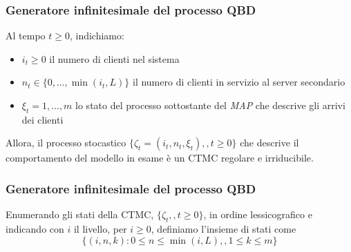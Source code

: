 \documentclass{beamer}
\begin{document}
\begin{frame}
    \frametitle{Generatore infinitesimale del processo QBD}
    Al tempo $t\geq 0$, indichiamo:
    \begin{itemize}
        \item $i_t\geq 0$ il numero di clienti nel sistema
        \item $n_t\in\{0,\ldots,\min(i_t,L)\}$ il numero di clienti in servizio al server secondario
        \item $\xi_t=1,\ldots,m$ lo stato del processo sottostante del \emph{MAP} che descrive gli arrivi dei clienti
    \end{itemize}
    \begin{block}{}
        Allora, il processo stocastico $\{\zeta_t=(i_t,n_t,\xi_t),,t\geq 0\}$ che descrive il comportamento del modello in esame è un CTMC regolare e irriducibile.
    \end{block}
\end{frame}






\begin{frame}
    \frametitle{Generatore infinitesimale del processo QBD}
    Enumerando gli stati della CTMC, $\{\zeta_t,,t\geq 0\}$, in ordine lessicografico e indicando con $i$ il livello, per $i\geq 0$, definiamo l'insieme di stati come
    $$\{(i,n,k):0\leq n\leq \min(i,L),,1\leq k\leq m\}$$
\end{frame}
\end{document}
